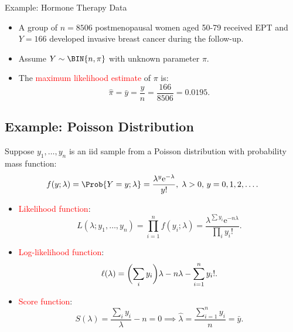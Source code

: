\documentclass{article}\usepackage[]{graphicx}\usepackage[svgnames]{xcolor}
\let\log\relax%
\begin{document}
\begin{Example}{Example: Hormone Therapy Data}
      \begin{itemize}
            \item A group of $ n=8506 $ postmenopausal women aged 50-79 received EPT and $ Y=166 $
                  developed invasive breast cancer during the follow-up.
            \item Assume $ Y \sim \BIN{n,\pi} $ with unknown parameter $ \pi $.
            \item The \textcolor{Red}{maximum likelihood estimate} of $ \pi $ is:
                  \[ \hat{\pi}=\bar{y}=\frac{y}{n} =\frac{166}{8506}=0.0195. \]
      \end{itemize}
\end{Example}
\subsection*{Example: Poisson Distribution}
Suppose $ y_1,\ldots,y_n $ is an iid sample from a Poisson distribution with probability mass function:
\[ f(y;\lambda)=\Prob{Y=y;\lambda}=\frac{\lambda^y \mathrm{e}^{-\lambda}}{y!},\; \lambda>0,\,y=0,1,2,\ldots.  \]
\begin{itemize}
      \item \textcolor{Red}{Likelihood function}:
            \[ L(\lambda;y_1,\ldots,y_n)=\prod_{i=1}^n f(y_i;\lambda)=\frac{\lambda^{\sum y_i}\mathrm{e}^{-n\lambda}}{\prod_i y_i!}.  \]
      \item \textcolor{Red}{Log-likelihood function}:
            \[ \ell(\lambda)=\biggl(\sum_i y_i\biggr)\log{\lambda}-n\lambda-\sum_{i=1}^{n} \log{y_i!}. \]
      \item \textcolor{Red}{Score function}:
            \[ S(\lambda)=\frac{\sum_i y_i}{\lambda}-n=0\implies \hat{\lambda}=\frac{\sum_{i=1}^{n} y_i}{n} =\bar{y}.  \]
\end{itemize}
\end{document}
